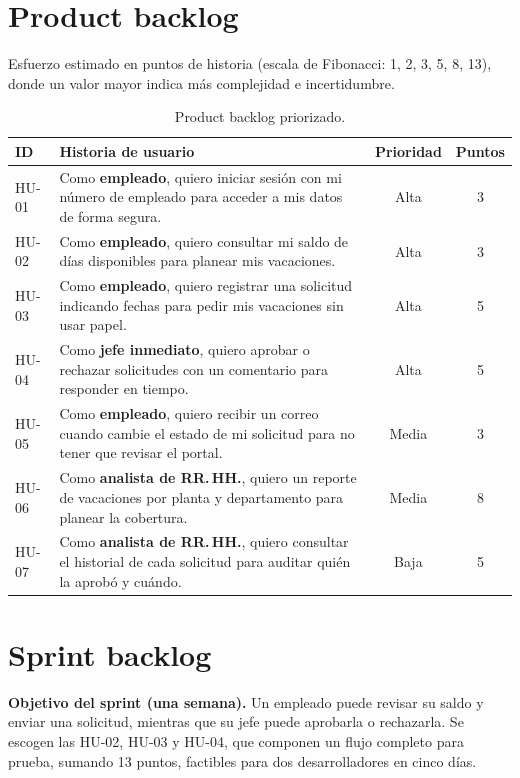 \documentclass[12pt,letterpaper]{article}
\begin{document}
\section{Product backlog}

Esfuerzo estimado en puntos de historia (escala de Fibonacci: 1, 2, 3, 5, 8,
13), donde un valor mayor indica más complejidad e incertidumbre.

\begin{table}[H]
\centering
\caption{Product backlog priorizado.}
\small
\begin{tabularx}{\textwidth}{lLcc}
\toprule
\textbf{ID} & \textbf{Historia de usuario} & \textbf{Prioridad} & \textbf{Puntos} \\
\midrule
HU-01 & Como \textbf{empleado}, quiero iniciar sesión con mi número de
        empleado para acceder a mis datos de forma segura. & Alta & 3 \\
HU-02 & Como \textbf{empleado}, quiero consultar mi saldo de días disponibles
        para planear mis vacaciones. & Alta & 3 \\
HU-03 & Como \textbf{empleado}, quiero registrar una solicitud indicando
        fechas para pedir mis vacaciones sin usar papel. & Alta & 5 \\
HU-04 & Como \textbf{jefe inmediato}, quiero aprobar o rechazar solicitudes
        con un comentario para responder en tiempo. & Alta & 5 \\
HU-05 & Como \textbf{empleado}, quiero recibir un correo cuando cambie el
        estado de mi solicitud para no tener que revisar el portal. & Media & 3 \\
HU-06 & Como \textbf{analista de RR.\,HH.}, quiero un reporte de vacaciones por
        planta y departamento para planear la cobertura. & Media & 8 \\
HU-07 & Como \textbf{analista de RR.\,HH.}, quiero consultar el historial de
        cada solicitud para auditar quién la aprobó y cuándo. & Baja & 5 \\
\bottomrule
\end{tabularx}
\end{table}

\section{Sprint backlog}

\textbf{Objetivo del sprint (una semana).} Un empleado puede revisar su saldo y enviar una solicitud, mientras que su jefe puede aprobarla o rechazarla. Se escogen las HU-02, HU-03 y HU-04, que componen un flujo completo para prueba, sumando 13 puntos, factibles para dos desarrolladores en cinco días.
\end{document}
